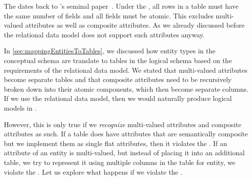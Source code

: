 %
\label{sec:normalForm:1}%
%
The  dates back to \citeauthor{C1970ARMODFLSDB}'s seminal paper~\cite{C1970ARMODFLSDB}.
Under the , all rows in a table must have the same number of fields and all fields must be atomic.
This excludes multi-valued attributes as well as composite attributes.
As we already discussed before the relational data model does not support such attributes anyway.

In \cref{sec:mappingEntitiesToTables}, we discussed how entity types in the conceptual schema are translate to tables in the logical schema based on the requirements of the relational data model.
We stated that multi-valued attributes become separate tables and that composite attributes need to be recursively broken down into their atomic components, which then become separate columns.
If we use the relational data model, then we would naturally produce logical models in .

However, this is only true if we \emph{recognize} multi-valued attributes and composite attributes as such.
If a table does have attributes that are semantically composite but we implement them as single flat attributes, then it violates the .
If an attribute of an entity is multi-valued, but instead of placing it into an additional table, we try to represent it using multiple columns in the table for entity, we violate the .
Let us explore what happens if we violate the .%
%
\FloatBarrier%
%
\FloatBarrier%
\endhsection%
%

